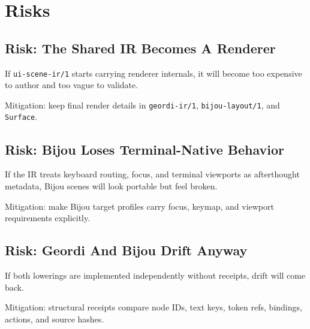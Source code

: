 \section{Risks}\label{record-138-risks}

\subsection{Risk: The Shared IR Becomes A Renderer}\label{record-138-risk-the-shared-ir-becomes-a-renderer}

If \texttt{u\allowbreak{}i\allowbreak{}-\allowbreak{}s\allowbreak{}c\allowbreak{}e\allowbreak{}n\allowbreak{}e\allowbreak{}-\allowbreak{}i\allowbreak{}r\allowbreak{}/\allowbreak{}1} starts carrying renderer internals, it will become too expensive to author and too vague to validate.

Mitigation: keep final render details in \texttt{g\allowbreak{}e\allowbreak{}o\allowbreak{}r\allowbreak{}d\allowbreak{}i\allowbreak{}-\allowbreak{}i\allowbreak{}r\allowbreak{}/\allowbreak{}1}, \texttt{b\allowbreak{}i\allowbreak{}j\allowbreak{}o\allowbreak{}u\allowbreak{}-\allowbreak{}l\allowbreak{}a\allowbreak{}y\allowbreak{}o\allowbreak{}u\allowbreak{}t\allowbreak{}/\allowbreak{}1}, and \texttt{S\allowbreak{}u\allowbreak{}r\allowbreak{}f\allowbreak{}a\allowbreak{}c\allowbreak{}e}.

\subsection{Risk: Bijou Loses Terminal-Native Behavior}\label{record-138-risk-bijou-loses-terminal-native-behavior}

If the IR treats keyboard routing, focus, and terminal viewports as afterthought metadata, Bijou scenes will look portable but feel broken.

Mitigation: make Bijou target profiles carry focus, keymap, and viewport requirements explicitly.

\subsection{Risk: Geordi And Bijou Drift Anyway}\label{record-138-risk-geordi-and-bijou-drift-anyway}

If both lowerings are implemented independently without receipts, drift will come back.

Mitigation: structural receipts compare node IDs, text keys, token refs, bindings, actions, and source hashes.

